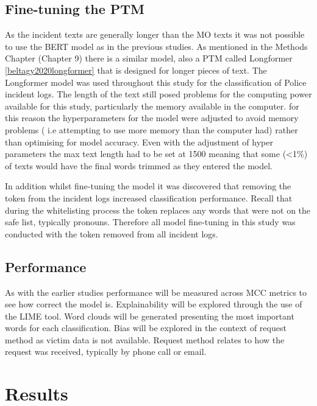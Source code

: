 \subsection{Fine-tuning the PTM} As the incident texts are generally longer than the MO texts it was not possible to use the BERT model as in the previous studies. As mentioned in the Methods Chapter (Chapter 9) there is a similar model, also a PTM called Longformer \ref{beltagy2020longformer}  that is designed for longer pieces of text. The Longformer model was used throughout this study for the classification of Police incident logs. The length of the text still posed problems for the computing power available for this study, particularly the memory available in the computer. for this reason the hyperparameters for the model were adjusted to avoid memory problems ( i.e attempting to use more memory than the computer had) rather than optimising for model accuracy. Even with the adjustment of hyper parameters the max text length had to be set at 1500 meaning that some (<1\%) of texts would have the final words trimmed as they entered the model.

In addition whilst fine-tuning the model it was discovered that removing the  token from the incident logs increased classification performance. Recall that during the whitelisting process the  token replaces any words that were not on the safe list, typically pronouns. Therefore all model fine-tuning in this study was conducted with the  token removed from all incident logs. 

\subsection{Performance} As with the earlier studies performance will be measured across MCC metrics to see how correct the model is. Explainability will be explored through the use of the LIME tool.  Word clouds will be generated presenting the most important words for each classification. Bias will be explored in the context of request method as victim data is not available. Request method relates to how the request was received, typically by phone call or email.

 

\section{Results}

